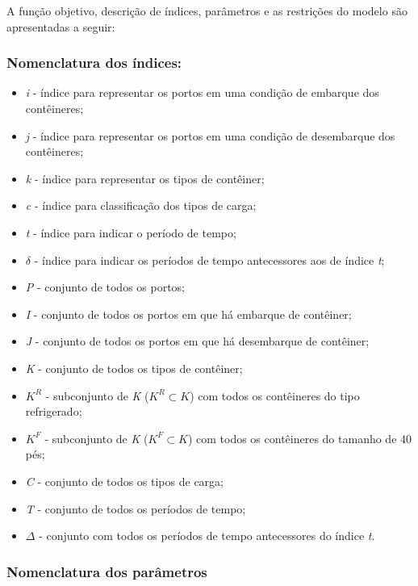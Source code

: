 \documentclass[preprint,10pt,5p]{elsarticle}
\begin{document}
A função objetivo, descrição de índices, parâmetros e as restrições do modelo são apresentadas a seguir:


\subsubsection{Nomenclatura dos índices:}

\begin{itemize}
    \item \textit{i} - índice para representar os portos em uma condição de embarque dos contêineres;
    \item \textit{j} - índice para representar os portos em uma condição de desembarque dos contêineres;
    \item \textit{k} - índice para representar os tipos de contêiner;
    \item \textit{c} - índice para classificação dos tipos de carga;
    \item \textit{t} - índice para indicar o período de tempo;
    \item \textit{$\delta$} - índice para indicar os períodos de tempo antecessores aos de índice \textit{t};
    \item \textit{P} - conjunto de todos os portos;
    \item \textit{I} - conjunto de todos os portos em que há embarque de contêiner;
    \item \textit{J} - conjunto de todos os portos em que há desembarque de contêiner;
    \item \textit{K} - conjunto de todos os tipos de contêiner;
    \item \textit{$K^R$} - subconjunto de \textit{K} ($K^R \subset K$) com todos os contêineres do tipo refrigerado;
    \item \textit{$K^F$} - subconjunto de \textit{K} ($K^F \subset K$) com todos os contêineres do tamanho de 40 pés;
    \item \textit{C} - conjunto de todos os tipos de carga;
    \item \textit{T} - conjunto de todos os períodos de tempo;
    \item \textit{$\Delta$} - conjunto com todos os períodos de tempo antecessores do índice \textit{t}.
\end{itemize}
\subsubsection{Nomenclatura dos parâmetros}
\end{document}
